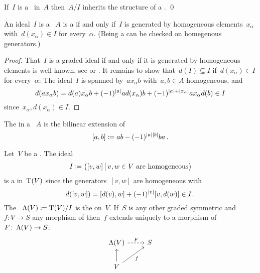 \documentclass[a4paper,10pt,headings=standardclasses]{scrartcl}
\begin{document}
\begin{lemma}
  If~$I$ is a~{\dgi} in~$A$ then~$A/I$ inherits the structure of a {\dga}.
  \qed
\end{lemma}

\begin{lemma}
  An ideal~$I$ is a {\dga}~$A$ is a {\dgi} if and only if~$I$ is generated by homogeneous elements~$x_\alpha$ with~$d(x_\alpha) \in I$ for every~$\alpha$.
  (Being a {\dgi} can be checked on homegenous generators.)
\end{lemma}

\begin{proof}
  That~$I$ is a graded ideal if and only if it is generated by homogeneous elements is  well-known, see \cite[IX, 2.5]{lang} or \cite[II.{\S}11.3]{bourbaki}.
  It remains to show that~$d(I) \subseteq I$ if~$d(x_\alpha) \in I$ for every~$\alpha$:
  The ideal~$I$ is spanned by~$a x_\alpha b$ with~$a, b \in A$ homogeneous, and
  \[
    d(a x_\alpha b)
    =
      d(a) x_\alpha b
    + (-1)^{\lvert a\rvert} a d(x_\alpha) b
    + (-1)^{\lvert a\rvert + \lvert x_\alpha\rvert} a x_\alpha d(b)
    \in
    I
  \]
  since~$x_\alpha, d(x_\alpha) \in I$.
\end{proof}

\begin{definition}
  The  in a {\dga}~$A$ is the bilinear extension of
  \[
    [a,b]
    \coloneqq
    ab - (-1)^{\lvert a\rvert\lvert b\rvert} ba \,.
  \]
\end{definition}

\begin{example}
  \label{dg symmetric algebra}
  Let~$V$ be a {\dgv}.
  The ideal
  \[
    I
    \defined
    \bigl(
      [v,w]
    \suchthat[\big]
      \text{$v,w \in V$ are homogeneous}
    \bigr)
  \]
  is a {\dgi} in~$\operatorname{T}(V)$ since the generators~$[v,w]$ are homogeneous with
  \[
    d([v,w])
    =
    [d(v), w] + (-1)^{\lvert v\rvert} [v, d(w)]
    \in
    I \,.
  \]
  The {\dga}~$\operatorname{\Lambda}(V) \coloneqq \operatorname{T}(V)/I$ is the  on~$V$.
  If~$S$ is any other graded symmetric {\dga} and~$f \colon V \to S$ any morphism of {\dgv} then~$f$ extends uniquely to a morphism of~{\dgas}~$F \colon \operatorname{\Lambda}(V) \to S$:
  \[
    \begin{tikzcd}
      \dgSymm(V)
      \arrow[dashed]{r}[above]{F}
      &
      S
      \\
      V
      \arrow{u}
      \arrow{ur}[below right]{f}
      &
      {}
    \end{tikzcd}
  \]

\end{example}
\end{document}
